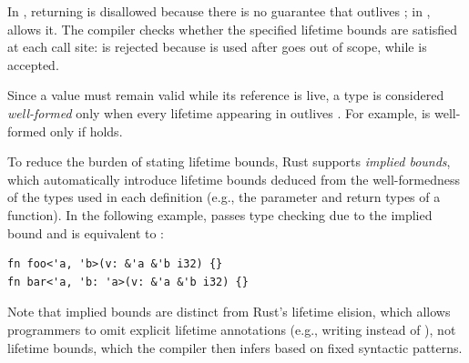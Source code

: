 \noindent
%
In , returning  is disallowed because there is no guarantee that
 outlives ;
%
in ,  allows it.
%
The compiler checks whether the specified lifetime bounds are satisfied at each
call site:
%
 is rejected because  is used after  goes out of scope, while
 is accepted.




Since a value must remain valid while its reference is live, a type 
is considered \emph{well-formed} only when every lifetime appearing in 
outlives .
%
For example,  is well-formed only if  holds.

To reduce the burden of stating lifetime bounds, Rust supports \emph{implied
bounds}, which automatically introduce lifetime bounds deduced from the
well-formedness of the types used in each definition (e.g., the parameter and
return types of a function).
%
In the following example,  passes type checking due to the implied bound
 and is equivalent to :

\vspace{-0.5em}
\begin{lstlisting}[basicstyle=\linespread{0.85}\ttfamily\footnotesize,]
fn foo<'a, 'b>(v: &'a &'b i32) {}
fn bar<'a, 'b: 'a>(v: &'a &'b i32) {}
\end{lstlisting}
\vspace{-0.5em}

\noindent
%
Note that implied bounds are distinct from Rust's lifetime elision, which allows
programmers to omit explicit lifetime annotations (e.g., writing 
instead of ), not lifetime bounds, which the compiler then infers
based on fixed syntactic patterns.

